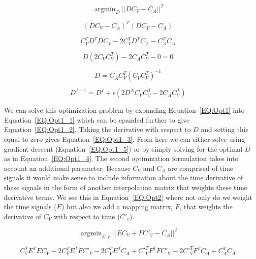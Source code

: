 \documentclass[12pt]{article}
\DeclareMathOperator*{\argmin}{argmin}
\begin{document}
\begin{equation}
\argmin_{D} ||DC_V - C_A||^2
\label{EQ:Opt1}
\end{equation}

\begin{equation}
(DC_V - C_A)^T(DC_V - C_A)
\label{EQ:Opt1_1}
\end{equation}

\begin{equation}
C_V^TD^TDC_V  - 2C_V^TD^TC_A - C_A^TC_A
\label{EQ:Opt1_2}
\end{equation}

\begin{equation}
D(2C_VC_V^T) - 2C_AC_V^T - 0 = 0
\label{EQ:Opt1_3}
\end{equation}

\begin{equation}
D = C_AC_V^T(C_VC_V^T)^{-1}
\label{EQ:Opt1_4}
\end{equation}

\begin{equation}
D^{I+1} = D^I + \epsilon(2D^NC_VC_V^T - 2C_AC_V^T)
\label{EQ:Opt1_5}
\end{equation}

We can solve this optimization problem by expanding Equation~\ref{EQ:Opt1} into Equation~\ref{EQ:Opt1_1} which can be epanded further to give Equation~\ref{EQ:Opt1_2}. Taking the derivative with respect to $D$ and setting this equal to zero gives Equation~\ref{EQ:Opt1_3}. From here we can either solve using gradient descent (Equation~\ref{EQ:Opt1_5}) or by simply solving for the optimal $D$ as in Equation~\ref{EQ:Opt1_4}. The second optimization formulation takes into account an additional parameter. Because $C_V$ and $C_A$ are comprised of time signals it would make sense to include information about the time derivative of these signals in the form of another interpolation matrix that weights these time derivative terms. We see this in Equation~\ref{EQ:Opt2} where not only do we weight the time signals ($E$) but also we add a mapping matrix, $F$, that weights the derivative of $C_V$ with respect to time ($C'_v$).

\begin{equation}
\argmin_{E,F} ||EC_V + FC'_V - C_A||^2
\label{EQ:Opt2}
\end{equation}

\begin{equation}
C_V^TE^TEC_V + 2C_V^TE^TFC'_V - 2C_V^TE^TC_A + C'_V^TF^TFC'_V - 2C'_V^TF^TC_A + C_A^TC_A
\label{EQ:Opt2_1}
\end{equation}
\end{document}
